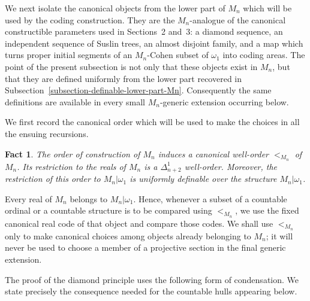\documentclass[a4paper,11pt]{article}
\newtheorem{fact}[theorem]{Fact}
\begin{document}
We next isolate the canonical objects from the lower part of $M_n$ which will
be used by the coding construction.  They are the $M_n$-analogue of the
canonical constructible parameters used in Sections~2 and~3: a diamond
sequence, an independent sequence of Suslin trees, an almost disjoint family,
and a map which turns proper initial segments of an $M_n$-Cohen subset of
$\omega_1$ into coding areas.  The point of the present subsection is not only
that these objects exist in $M_n$, but that they are defined uniformly from the
lower part recovered in Subsection~\ref{subsection-definable-lower-part-Mn}.
Consequently the same definitions are available in every small
$M_n$-generic extension occurring below.

We first record the canonical order which will be used to make the choices in
all the ensuing recursions.

\begin{fact}
\label{fact-canonical-construction-order-Mn}
The order of construction of $M_n$ induces a canonical well-order
$<_{M_n}$ of $M_n$.  Its restriction to the reals of $M_n$ is a
$\Delta^1_{n+2}$ well-order.  Moreover, the restriction of this order to
$M_n|\omega_1$ is uniformly definable over the structure
$M_n|\omega_1$.
\end{fact}

Every real of $M_n$ belongs to $M_n|\omega_1$.  Hence, whenever a
subset of a countable ordinal or a countable structure is to be compared using
$<_{M_n}$, we use the fixed canonical real code of that object and compare
those codes.  We shall use $<_{M_n}$ only to make canonical choices among
objects already belonging to $M_n$; it will never be used to choose a member
of a projective section in the final generic extension.

The proof of the diamond principle uses the following form of condensation.
We state precisely the consequence needed for the countable hulls appearing
below.
\end{document}
